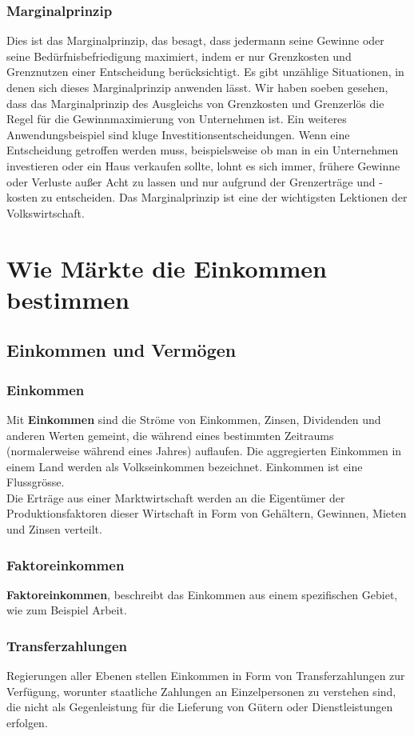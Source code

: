 \documentclass[10pt]{scrartcl}
\begin{document}
\subsubsection{Marginalprinzip}
Dies ist das Marginalprinzip, das besagt, dass jedermann seine Gewinne oder seine Bedürfnisbefriedigung maximiert, indem er nur Grenzkosten und Grenznutzen einer Entscheidung berücksichtigt. Es gibt unzählige Situationen, in denen sich dieses Marginalprinzip anwenden lässt. Wir haben soeben gesehen, dass das Marginalprinzip des Ausgleichs von Grenzkosten und Grenzerlös die Regel für die Gewinnmaximierung von Unternehmen ist. Ein weiteres Anwendungsbeispiel sind kluge Investitionsentscheidungen. Wenn eine Entscheidung getroffen werden muss, beispielsweise ob man in ein Unternehmen investieren oder ein Haus verkaufen sollte, lohnt es sich immer, frühere Gewinne oder Verluste außer Acht zu lassen und nur aufgrund der Grenzerträge und -kosten zu entscheiden. Das Marginalprinzip ist eine der wichtigsten Lektionen der Volkswirtschaft.


\section{Wie Märkte die Einkommen bestimmen}
\subsection{Einkommen und Vermögen}
\subsubsection{Einkommen}
Mit {\bf Einkommen} sind die Ströme von Einkommen, Zinsen, Dividenden und anderen Werten gemeint, die während eines bestimmten Zeitraums (normalerweise während eines Jahres) auflaufen. Die aggregierten Einkommen in einem Land werden als Volkseinkommen bezeichnet. 
Einkommen ist eine Flussgrösse.
\\
Die Erträge aus einer Marktwirtschaft werden an die Eigentümer der Produktionsfaktoren dieser Wirtschaft in Form von Gehältern, Gewinnen, Mieten und Zinsen verteilt.
\subsubsection{Faktoreinkommen}
{\bf Faktoreinkommen}, beschreibt das Einkommen aus einem spezifischen Gebiet, wie zum Beispiel Arbeit.
\subsubsection{Transferzahlungen}
Regierungen aller Ebenen stellen Einkommen in Form von Transferzahlungen zur Verfügung, worunter staatliche Zahlungen an Einzelpersonen zu verstehen sind, die nicht als Gegenleistung für die Lieferung von Gütern oder Dienstleistungen erfolgen.
\end{document}
